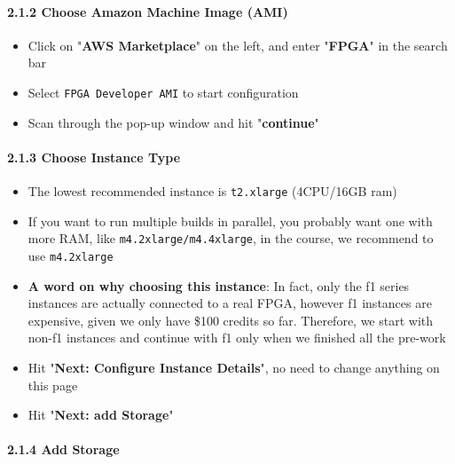 \documentclass[]{article}
\let\oldparagraph\paragraph
\renewcommand{\paragraph}[1]{\oldparagraph{#1}\mbox{}}
\begin{document}
\hypertarget{header-n100}{%
\paragraph{2.1.2 Choose Amazon Machine Image (AMI)}\label{header-n100}}

\begin{itemize}
\item
  Click on "\textbf{AWS Marketplace}" on the left, and enter
  "\textbf{FPGA}" in the search bar
\item
  Select \texttt{FPGA\ Developer\ AMI} to start configuration
\item
  Scan through the pop-up window and hit "\textbf{continue}"
\end{itemize}

\hypertarget{header-n111}{%
\paragraph{2.1.3 Choose Instance Type}\label{header-n111}}

\begin{itemize}
\item
  The lowest recommended instance is \texttt{t2.xlarge} (4CPU/16GB ram)
\item
  If you want to run multiple builds in parallel, you probably want one
  with more RAM, like \texttt{m4.2xlarge/m4.4xlarge}, in the course, we
  recommend to use \texttt{m4.2xlarge}
\item
  \textbf{A word on why choosing this instance}: In fact, only the f1
  series instances are actually connected to a real FPGA, however f1
  instances are expensive, given we only have \$100 credits so far.
  Therefore, we start with non-f1 instances and continue with f1 only
  when we finished all the pre-work
\item
  Hit "\textbf{Next: Configure Instance Details}", no need to change
  anything on this page
\item
  Hit "\textbf{Next: add Storage}"
\end{itemize}

\hypertarget{header-n128}{%
\paragraph{2.1.4 Add Storage}\label{header-n128}}
\end{document}
